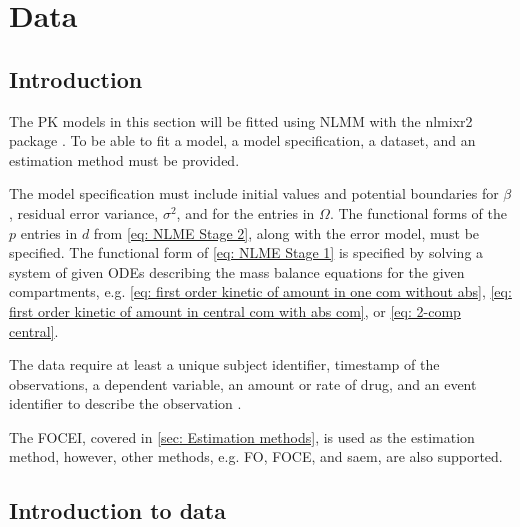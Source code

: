 \chapter{Data}
\section{Introduction}
The PK models in this section will be fitted using NLMM with the nlmixr2 package \citep{nlmixr, nlmixrarticle}. To be able to fit a model, a model specification, a dataset, and an estimation method must be provided.

The model specification must include initial values and potential boundaries for $\beta$, residual error variance, $\sigma^2$, and for the entries in $\Omega$. The functional forms of the $p$ entries in $d$ from \eqref{eq: NLME Stage 2}, along with the error model, must be specified.
The functional form of \ref{eq: NLME Stage 1} is specified by solving a system of given ODEs describing the mass balance equations for the given compartments, e.g. \eqref{eq: first order kinetic of amount in one com without abs}, \eqref{eq: first order kinetic of amount in central com with abs com}, or \eqref{eq: 2-comp central}.

The data require at least a unique subject identifier, timestamp of the observations, a dependent variable, an amount or rate of drug, and an event identifier to describe the observation \citep{nlmixrarticle}. 

The FOCEI, covered in \ref{sec: Estimation methods}, is used as the estimation method, however, other methods, e.g. FO, FOCE, and saem, are also supported. 



\section{Introduction to data}

